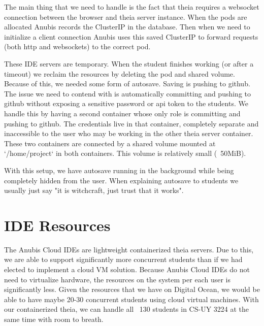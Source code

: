 The main thing that we need to handle is the fact that theia requires a websocket connection between the browser and
theia server instance. When the pods are allocated Anubis records the ClusterIP in the database. Then when we need to
initialize a client connection Anubis uses this saved ClusterIP to forward requests (both http and websockets) to the
correct pod.

These IDE servers are temporary. When the student finishes working (or after a timeout) we reclaim the resources by
deleting the pod and shared volume. Because of this, we needed some form of autosave. Saving is pushing to github.
The issue we need to contend with is automatically committing and pushing to github without exposing a sensitive
password or api token to the students. We handle this by having a second container whose only role is committing and
pushing to github. The credentials live in that container, completely separate and inaccessible to the user who
may be working in the other theia server container. These two containers are connected by a shared volume mounted
at `/home/project` in both containers. This volume is relatively small (~50MiB).

With this setup, we have autosave running in the background while being completely hidden from the user. When
explaining autosave to students we usually just say "it is witchcraft, just trust that it works".

\section{IDE Resources}\label{sec:ide-resources}

The Anubis Cloud IDEs are lightweight containerized theia servers.
Due to this, we are able to support significantly more concurrent students
than if we had elected to implement a cloud VM solution.
Because Anubis Cloud IDEs do not need to virtualize hardware,
the resources on the system per each user is significantly less.
Given the resources that we have on Digital Ocean,
we would be able to have maybe 20-30 concurrent students using cloud virtual machines.
With our containerized theia, we can handle all ~130 students in CS-UY 3224 at the same
time with room to breath.
